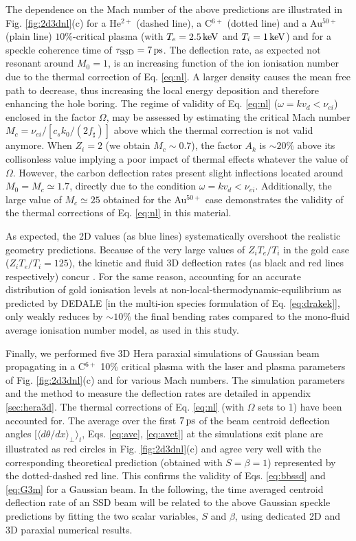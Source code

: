 \documentclass[%
 reprint,
 amsmath,amssymb,
 aps,
]{revtex4-1}
\begin{document}
The dependence on the Mach number of the above predictions are illustrated in Fig.  \ref{fig:2d3dnl}(c)  for a He$^{2+}$ (dashed line), a C$^{6+}$ (dotted line) and a Au$^{50+}$ (plain line) $10\%$-critical  plasma (with $T_e=2.5\, \rm keV$ and $T_i = 1\,\rm keV$) and for a speckle coherence time of $\tau_\mathrm{SSD}=7\,\rm ps$. The deflection rate, as expected not resonant around $M_0=1$, is an increasing function of the ion ionisation number due to the thermal correction of Eq. \eqref{eq:nl}. 
A larger density causes the mean free path to decrease, thus increasing the local energy deposition and therefore enhancing the hole boring. 
%
The regime of validity of Eq. \eqref{eq:nl} ($\omega=kv_d<\nu_{ei}$) enclosed in the factor $\Omega$, may be assessed by estimating the critical Mach number $M_c = \nu_{ei}/[ c_sk _0/(2f_\sharp) ]$ above which the thermal correction is not valid anymore.  When $Z_i=2$ (we obtain $M_c \sim 0.7$), the factor $A_k$ is $\sim 20\%$ above its collisonless value  implying  a poor impact of thermal effects whatever the value of $\Omega$. However, the carbon deflection rates present slight inflections located around $M_0=M_c \simeq 1.7$, directly due to the condition $\omega=kv_d<\nu_{ei}$. 
Additionally, the  large value of $M_c \simeq 25$  obtained for the Au$^{50+}$ case  demonstrates the validity of the thermal corrections of Eq. \eqref{eq:nl} in this material.

As expected, the 2D values (as blue lines) systematically overshoot the realistic geometry predictions. 
Because of the very large values of $Z_iT_e/T_i$ in the gold case  ($Z_iT_e/T_i=125$), the kinetic and fluid 3D deflection rates (as black and red lines respectively) concur \cite[]{POP_Ruyer_2020}.  For the same reason, accounting for an accurate distribution of gold ionisation levels at non-local-thermodynamic-equilibrium as predicted by DEDALE \cite[]{HEDP_Gilleron_2015} [in the multi-ion species formulation of Eq. \eqref{eq:drakek}],  only weakly reduces by $\sim 10\%$ the final bending rates compared to the mono-fluid average ionisation number model, as used in this study.

Finally, we performed five 3D Hera paraxial simulations of  Gaussian beam propagating in a C$^{6+}$ 10\% critical plasma with the laser and plasma parameters of Fig. \ref{fig:2d3dnl}(c) and for various Mach numbers. The simulation parameters and the method to measure the deflection rates are detailed in appendix \ref{sec:hera3d}. The thermal corrections of Eq. \eqref{eq:nl} (with $\Omega$ sets to 1) have been accounted for. The average over the first $7 \, \rm ps$ of the beam centroid deflection angles [$\langle d\theta/dx \rangle_\perp \rangle_t$, Eqs. \eqref{eq:ave}, \eqref{eq:avet}] at the simulations exit plane are illustrated as red circles in Fig. \ref{fig:2d3dnl}(c) and  agree very well with the corresponding theoretical prediction (obtained with $S=\beta=1$) represented by the dotted-dashed red line. This confirms the validity of Eqs.  \eqref{eq:bbssd} and \eqref{eq:G3m} for a Gaussian beam. 
In the following,  the time averaged centroid deflection rate of an SSD beam will be related to the  above Gaussian speckle predictions by fitting the two scalar variables, $S$ and $\beta$, using dedicated 2D and 3D paraxial numerical results.
\end{document}
